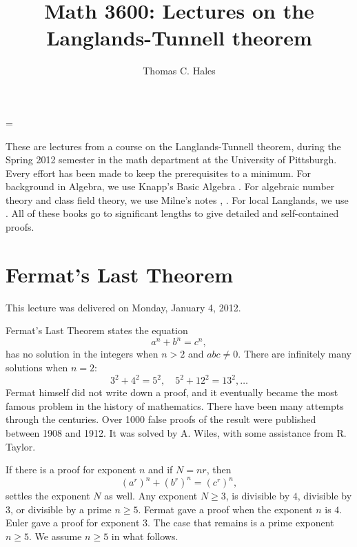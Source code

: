 \documentclass{amsart}
\begin{document}
\title{Math 3600: Lectures on the Langlands-Tunnell theorem}
\author{Thomas C. Hales}
\maketitle


    \tableofcontents





\parindent=0pt
\parskip=\baselineskip
\def\seg{~~~}
\def\text{\hbox}

These are lectures from a course on the Langlands-Tunnell theorem, during
the Spring 2012 semester in the math department at the University of Pittsburgh.%
Every effort has been made to keep the prerequisites to a minimum.
For background in Algebra, we use Knapp's Basic Algebra \cite{knapp-basic}.
For algebraic number theory and class field theory, 
we use Milne's notes 
\cite{ANT}, \cite{CFT}.  For local Langlands, we use \cite{bushnell-henniart}.
All of these books go to significant lengths to give detailed and self-contained 
proofs.

\newpage
\section{Fermat's Last Theorem}

This lecture was delivered on Monday, January 4, 2012.

Fermat's Last Theorem \cite{DDT} states the equation
\[
a^n + b^n = c^n,
\]
has no solution in the integers when $n>2$ and $abc\ne 0$.  There are
infinitely many solutions when $n=2$:
\[
3^2 + 4^2 = 5^2,\quad 5^2 + 12^2 = 13^2, \ldots
\]
Fermat himself did not write down a proof, and it eventually became
the most famous problem in the history of mathematics.  There have
been many attempts through the centuries.  Over 1000 false proofs of
the result were published between 1908 and 1912.  It was solved by
A. Wiles, with some assistance from R. Taylor.

If there is a proof for exponent $n$ and if $N = n r$, then
\[
(a^r)^n + (b^r)^n = (c^r)^n,
\]
settles the exponent $N$ as well.  Any exponent $N\ge3$, is divisible
by $4$, divisible by $3$, or divisible by a prime $n\ge 5$.  Fermat
gave a proof when the exponent $n$ is $4$.  Euler gave a proof for
exponent $3$.  The case that remains is a prime exponent $n\ge 5$.  We
assume $n\ge5$ in what follows.
\end{document}
